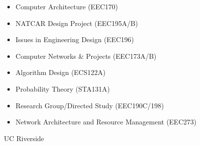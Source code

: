\begin{cvcourses}
{\begin{multicols}{3}
\begin{itemize}
          \item Computer Architecture (EEC170) %
          \item NATCAR Design Project (EEC195A/B) %
          \item Issues in Engineering Design (EEC196) %
          \item Computer Networks \& Projects (EEC173A/B) %
          \item Algorithm Design (ECS122A) %
          \item Probability Theory (STA131A) %
          \item Research Group/Directed Study (EEC190C/198) %
          \item Network Architecture and Resource Management (EEC273) %
        \end{itemize}
      \end{multicols}
    }
  \cvcourselist
    {UC Riverside} %
    {
      \begin{multicols}{3}
        \begin{itemize}

\end{itemize}
\end{multicols}}
\end{cvcourses}
